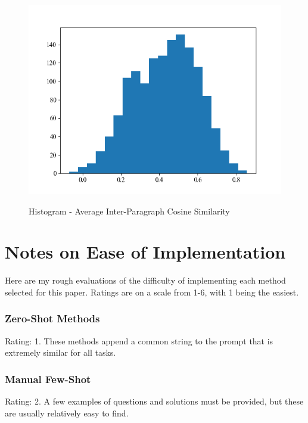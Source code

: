 \documentclass[11pt]{article}
\begin{document}
\begin{figure}[h]
  \caption{Histogram - Average Inter-Paragraph Cosine Similarity}
  \centering
  \includegraphics[width=\textwidth]{../Output for Report/avg_inter_paragraph_cosine_sim_hist.png}
  \label{fig:avg_inter_paragraph_cosine_sim_hist}
\end{figure}

\clearpage
\newpage

\section{Notes on Ease of Implementation}
\label{sec:difficulty}

Here are my rough evaluations of the difficulty of implementing each method selected for this paper. Ratings are on a scale from 1-6, with 1 being the easiest.

\subsubsection*{Zero-Shot Methods}

Rating: 1. These methods append a common string to the prompt that is extremely similar for all tasks.

\subsubsection*{Manual Few-Shot}

Rating: 2. A few examples of questions and solutions must be provided, but these are usually relatively easy to find.
\end{document}
